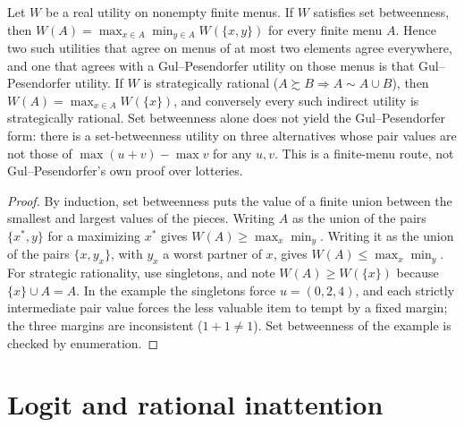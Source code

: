 \begin{theorem}
\label{thm:beh-gp-pairs}
\leanok
Let $W$ be a real utility on nonempty finite menus. If $W$ satisfies set betweenness, then
$W(A)=\max_{x\in A}\min_{y\in A}W(\{x,y\})$ for every finite menu $A$. Hence two such utilities that agree on menus of at
most two elements agree everywhere, and one that agrees with a Gul--Pesendorfer utility on those menus is that
Gul--Pesendorfer utility. If $W$ is strategically rational ($A\succsim B\Rightarrow A\sim A\cup B$), then
$W(A)=\max_{x\in A}W(\{x\})$, and conversely every such indirect utility is strategically rational. Set betweenness alone
does not yield the Gul--Pesendorfer form: there is a set-betweenness utility on three alternatives whose pair values are
not those of $\max(u+v)-\max v$ for any $u,v$. This is a finite-menu route, not Gul--Pesendorfer's own proof over
lotteries.
\end{theorem}
\begin{proof}
\leanok
By induction, set betweenness puts the value of a finite union between the smallest and largest values of the pieces.
Writing $A$ as the union of the pairs $\{x^*,y\}$ for a maximizing $x^*$ gives $W(A)\ge\max_x\min_y$. Writing it as the
union of the pairs $\{x,y_x\}$, with $y_x$ a worst partner of $x$, gives $W(A)\le\max_x\min_y$. For strategic rationality,
use singletons, and note $W(A)\ge W(\{x\})$ because $\{x\}\cup A=A$. In the example the singletons force $u=(0,2,4)$, and
each strictly intermediate pair value forces the less valuable item to tempt by a fixed margin; the three margins are
inconsistent ($1+1\ne1$). Set betweenness of the example is checked by enumeration.
\end{proof}

\section{Logit and rational inattention}
\label{sec:beh-ri}

